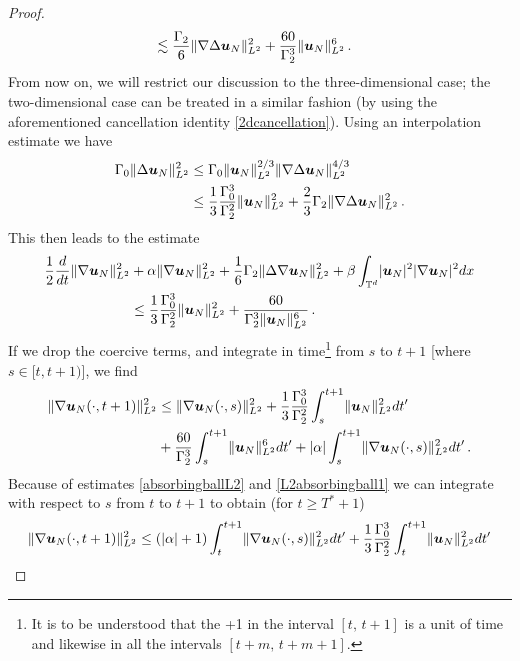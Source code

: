 \documentclass[11pt]{amsart}
\newcommand{\bu}{\mbox{\boldmath$u$}}
\newcommand{\Rb}{\beta}
\newcommand{\Gamzero}{\Gamma_{0}}
\newcommand{\Gamtwo}{\Gamma_{2}}
\theoremstyle{definition}
\numberwithin{equation}{section}
\numberwithin{equation}{section}
\begin{document}
\begin{proof}
\begin{align*}
&\lesssim \frac{\Gamtwo}{6} \lVert \nabla \Delta \bu_N \rVert_{L^2}^2 + \frac{60}{\Gamtwo^3} \lVert \bu_N \rVert_{L^2}^{6}\,.
\end{align*}
From now on, we will restrict our discussion to the three-dimensional case; the two-dimensional case can be treated in a similar fashion (by using the aforementioned cancellation identity \eqref{2dcancellation}). Using an interpolation estimate we have
\begin{align*}
\Gamzero \lVert \Delta \bu_N \rVert_{L^2}^2 &\leq \Gamzero \lVert  \bu_N \rVert_{L^2}^{2/3} \lVert \nabla \Delta \bu_N \rVert_{L^2}^{4/3} \\
&\leq \frac{1}{3} \frac{\Gamzero^3}{\Gamtwo^2} \lVert \bu_N \rVert_{L^2}^2 + \frac{2}{3} \Gamtwo \lVert \nabla \Delta \bu_N \rVert_{L^2}^{2}\,.
\end{align*}
This then leads to the estimate
\begin{align}
\frac{1}{2} \frac{d}{d t} \lVert \nabla \bu_N \rVert_{L^2}^2 &+ \alpha \lVert \nabla \bu_N \rVert_{L^2}^2 + \frac{1}{6} \Gamtwo \lVert \Delta \nabla \bu_N \rVert_{L^2}^2 + \Rb \int_{\mathbb{T}^d} \lvert \bu_N \rvert^2 \lvert \nabla \bu_N \rvert^2 dx \nonumber \\
&\leq \frac{1}{3} \frac{\Gamzero^3}{\Gamtwo^2} \lVert \bu_N \rVert_{L^2}^2 + \frac{60}{\Gamtwo^{3} \lVert \bu_N \rVert_{L^2}^6}\,.\label{H1estimate}
\end{align}
If we drop the coercive terms, and integrate in time\footnote{It is to be understood that the +1 in the interval $[t,\,t+1]$ is a unit of time and likewise in all the intervals $[t+m,\,t+m+1]$.} from $s$ to $t+1$ [where $s \in [t, t+1)$], we find
\begin{align*}
\lVert \nabla \bu_N (\cdot, t + 1) \rVert_{L^2}^2 &\leq \lVert \nabla \bu_N (\cdot, s) \rVert_{L^2}^2 + \frac{1}{3} \frac{\Gamzero^3}{\Gamtwo^2} \int_s^{t+1} \lVert \bu_N \rVert_{L^2}^2 dt' \\
&+ \frac{60}{\Gamtwo^3} \int_s^{t+1} \lVert \bu_N \rVert_{L^2}^6 dt' + \lvert \alpha \rvert \int_s^{t+1} \lVert \nabla \bu_N (\cdot, s) \rVert_{L^2}^2 dt'\,.
\end{align*} 
Because of estimates \eqref{absorbingballL2} and \eqref{L2absorbingball1} we can integrate with respect to $s$ from $t$ to $t+1$ to obtain (for $t \geq T^* + 1$)
\begin{align} 
\lVert \nabla \bu_N (\cdot, t + 1) \rVert_{L^2}^2 &\leq (\lvert \alpha \rvert + 1) \int_t^{t+1} \lVert \nabla \bu_N (\cdot, s) \rVert_{L^2}^2 dt' + \frac{1}{3} \frac{\Gamzero^3}{\Gamtwo^2} \int_t^{t+1} \lVert \bu_N \rVert_{L^2}^2 dt' \nonumber \\

\end{align}
\end{proof}
\end{document}

